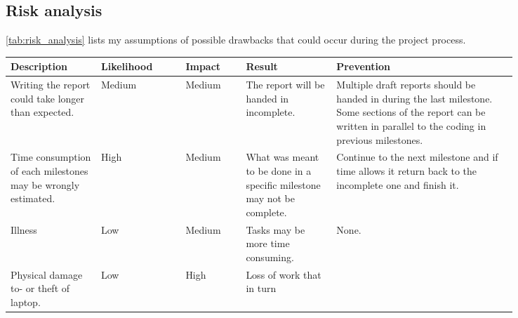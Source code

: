\subsection{Risk analysis}
\cref{tab:risk_analysis} lists my assumptions of possible drawbacks
that could occur during the project process.
\begin{table}[H]
  \centering
  \begin{tabular}{|p{0.15\linewidth}|
                   p{0.14\linewidth}|
                   p{0.1\linewidth}|
                   p{0.15\linewidth}|
                   p{0.30\linewidth}|}
    \hline
    \textbf{Description} & \textbf{Likelihood} & \textbf{Impact} & \textbf{Result} & \textbf{Prevention} \\
    \hline
    Writing the report could take longer than expected.
                & Medium     & Medium & The report will be handed in
                                        incomplete.
                                               & Multiple draft
                                                 reports should be
                                                 handed in during the
                                                 last milestone. Some
                                                 sections of the
                                                 report can be written
                                                 in parallel to the
                                                 coding in previous
                                                 milestones. \\
    \hline
    Time consumption of each milestones may be wrongly estimated.
                & High       & Medium & What was meant to be done in a
                                        specific milestone may not be
                                        complete.
                                               & Continue to the next
                                                 milestone and if time
                                                 allows it return back
                                                 to the incomplete one
                                                 and finish it. \\
    \hline
    Illness     & Low        & Medium & Tasks may be more time
                                        consuming.
                                               & None. \\
    \hline
    Physical damage to- or theft of laptop.
                & Low        & High   & Loss of work that in turn

\end{tabular}
\end{table}
